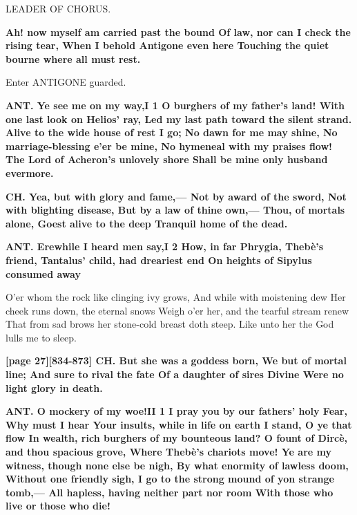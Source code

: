 \documentclass[11pt,letter]{book}
\begin{document}
\par  LEADER OF CHORUS.

\par \textbf{Ah! now myself am carried past the bound Of law, nor can I check the rising tear, When I behold Antigone even here Touching the quiet bourne where all must rest.}
\par 

\par  Enter ANTIGONE guarded.

\par \textbf{ANT. Ye see me on my way,I 1 O burghers of my father’s land! With one last look on Helios’ ray, Led my last path toward the silent strand. Alive to the wide house of rest I go; No dawn for me may shine, No marriage-blessing e’er be mine, No hymeneal with my praises flow! The Lord of Acheron’s unlovely shore Shall be mine only husband evermore.}
\par 

\par \textbf{CH. Yea, but with glory and fame,— Not by award of the sword, Not with blighting disease, But by a law of thine own,— Thou, of mortals alone, Goest alive to the deep Tranquil home of the dead.}
\par 

\par \textbf{ANT. Erewhile I heard men say,I 2 How, in far Phrygia, Thebè’s friend, Tantalus’ child, had dreariest end On heights of Sipylus consumed away}
\par   O’er whom the rock like clinging ivy grows, And while with moistening dew Her cheek runs down, the eternal snows Weigh o’er her, and the tearful stream renew That from sad brows her stone-cold breast doth steep. Like unto her the God lulls me to sleep.

\par \textbf{[page 27][834-873] CH. But she was a goddess born, We but of mortal line; And sure to rival the fate Of a daughter of sires Divine Were no light glory in death.}
\par 

\par \textbf{ANT. O mockery of my woe!II 1 I pray you by our fathers’ holy Fear, Why must I hear Your insults, while in life on earth I stand, O ye that flow In wealth, rich burghers of my bounteous land? O fount of Dircè, and thou spacious grove, Where Thebè’s chariots move! Ye are my witness, though none else be nigh, By what enormity of lawless doom, Without one friendly sigh, I go to the strong mound of yon strange tomb,— All hapless, having neither part nor room With those who live or those who die!}
\par 
\end{document}
